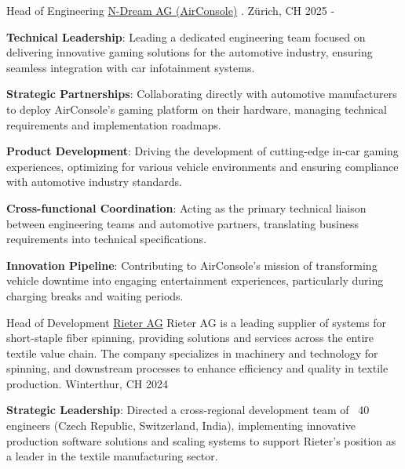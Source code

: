 
\begin{cventries}
  \cventry
    {Head of Engineering} %
    {\href{https://www.n-dream.com}{N-Dream AG (AirConsole)}} %
    {.} %
    {Zürich, CH} %
    {2025 - } %
    {
        \begin{cvitems}
            \item {\textbf{Technical Leadership}: Leading a dedicated engineering team focused on delivering innovative gaming solutions for the automotive industry, ensuring seamless integration with car infotainment systems.}
            \item {\textbf{Strategic Partnerships}: Collaborating directly with automotive manufacturers to deploy AirConsole’s gaming platform on their hardware, managing technical requirements and implementation roadmaps.}
            \item {\textbf{Product Development}: Driving the development of cutting-edge in-car gaming experiences, optimizing for various vehicle environments and ensuring compliance with automotive industry standards.}
            \item {\textbf{Cross-functional Coordination}: Acting as the primary technical liaison between engineering teams and automotive partners, translating business requirements into technical specifications.}
            \item {\textbf{Innovation Pipeline}: Contributing to AirConsole’s mission of transforming vehicle downtime into engaging entertainment experiences, particularly during charging breaks and waiting periods.}
        \end{cvitems}
    }
  \cventry
    {Head of Development} %
    {\href{https://www.rieter.com}{Rieter AG}} %
    {Rieter AG is a leading supplier of systems for short-staple fiber spinning, providing solutions and services across the entire textile value chain. The company specializes in machinery and technology for spinning, and downstream processes to enhance efficiency and quality in textile production.} %
    {Winterthur, CH} %
    {2024} %
    {
        \begin{cvitems}
            \item {\textbf{Strategic Leadership}: Directed a cross-regional development team of ~40 engineers (Czech Republic, Switzerland, India), implementing innovative production software solutions and scaling systems to support Rieter’s position as a leader in the textile manufacturing sector.}

\end{cvitems}}
\end{cventries}
